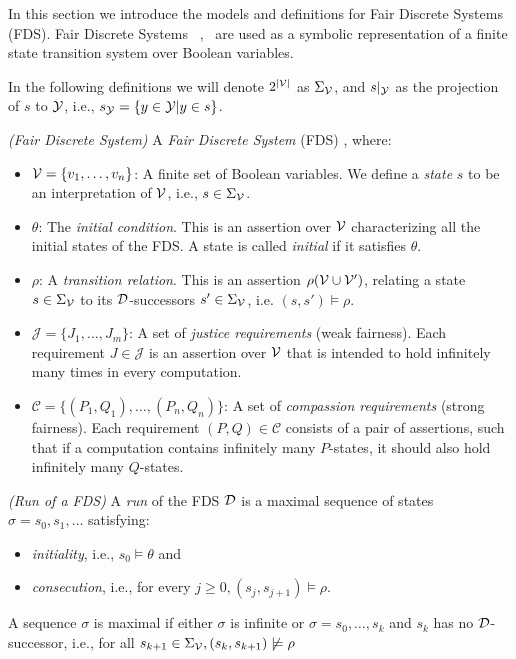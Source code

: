 
In this section we introduce the models and definitions for Fair Discrete Systems (FDS). Fair Discrete Systems ~\cite{kesten2000verification},~\cite{bloem2012synthesis} are used as a symbolic representation of a finite state transition system over Boolean variables. 

In the following definitions we will denote $2^{|{\mathcal{V}}|}$ as $\Sigma_{{\mathcal{V}}}$, and $s|_{{\mathcal{Y}}}$ as the projection of $s$ to ${\mathcal{Y}}$, i.e., $s_{{\mathcal{Y}}} = \{y \in {\ensuremath{\mathcal{Y}}} | y \in s \}$.

\begin{definition}
	\label{def:FDS} \emph{(Fair Discrete System)} 
	A \emph{Fair Discrete System} (FDS) \fdsDef, where:
	\begin{itemize}
		\item ${\mathcal{V}} = \{v_1,\ldots,v_n \}$: A finite set of Boolean variables. We define a \emph{state} $s$ to be an interpretation of ${\mathcal{V}}$, i.e., $s \in \Sigma_{{\mathcal{V}}}$.
		\item $\theta$: The \emph{initial condition}. This is an assertion over ${\mathcal{V}}$ characterizing all the initial states of the FDS. A state is called \emph{initial} if it satisfies $\theta$.
		\item $\rho$: A \emph{transition relation}. This is an assertion $\rho({\mathcal{V}} \cup {\ensuremath{\mathcal{V}}}')$, relating a state $s \in \Sigma_{{\mathcal{V}}}$ to its $\mathcal{D}$-successors $s' \in \Sigma_{{\mathcal{V}}}$, i.e. $(s,s') \models \rho$.
		\item $\mathcal{J} = \{J_1, \ldots, J_m \}$: A set of \emph{justice requirements} (weak fairness). Each requirement $J \in \mathcal{J}$ is an assertion over ${\mathcal{V}}$ that is intended to hold infinitely many times in every computation.
		\item $\mathcal{C} = \{(P_1,Q_1), \ldots, (P_n,Q_n) \}$: A set of \emph{compassion requirements} (strong fairness). Each requirement $(P,Q) \in \mathcal{C}$ consists of a pair of assertions, such that if a computation contains infinitely many $P$-states, it should also hold infinitely many $Q$-states.
	\end{itemize}
\end{definition}

\begin{definition}
	\label{def:fds_run} \emph{(Run of a FDS)} 
	A \emph{run} of the FDS $\mathcal{D}$ is a maximal sequence of states $\sigma = s_0,s_1,\ldots$
	satisfying:
	\begin{itemize}
		\item \emph{initiality}, i.e., $s_0\models \theta$ and
		\item \emph{consecution}, i.e., for every $j\geq 0, (s_j, s_{j+1})\models \rho$.
	\end{itemize}
	A sequence $\sigma$ is maximal if either $\sigma$ is infinite or $\sigma=s_0,\ldots,s_k$ and $s_k$ has no $\mathcal{D}$-successor, i.e., for all $s_{k+1} \in \Sigma_{{\mathcal{V}}}, (s_k,s_{k+1}) \not\models \rho$
\end{definition}


